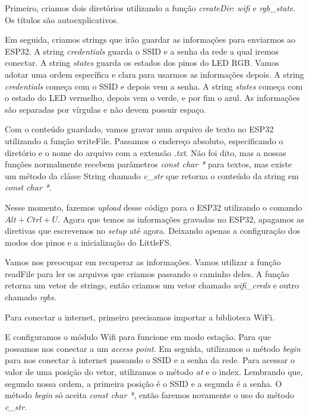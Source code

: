 \documentclass[12pt]{article}
\begin{document}
Primeiro, criamos dois diretórios utilizando a função \textit{createDir}: \textit{wifi} e \textit{rgb\_state}. Os títulos são autoexplicativos.



Em seguida, criamos strings que irão guardar as informações para enviarmos ao ESP32. A string \textit{credentials} guarda o SSID e a senha da rede a qual iremos conectar. A string \textit{states} guarda os estados dos pinos do LED RGB. Vamos adotar uma ordem específica e clara para usarmos as informações depois. A string \textit{credentials} começa com o SSID e depois vem a senha. A string \textit{states} começa com o estado do LED vermelho, depois vem o verde, e por fim o azul. As informações são separadas por vírgulas e não devem possuir espaço.



Com o conteúdo guardado, vamos gravar num arquivo de texto no ESP32 utilizando a função writeFile. Passamos o endereço absoluto, especificando o diretório e o nome do arquivo com a extensão .\textit{txt}. Não foi dito, mas a nossas funções normalmente recebem parâmetros \textit{const char *} para textos, mas existe um método da clásse String chamado \textit{c\_str} que retorna o conteúdo da string em \textit{const char *}.



Nesse momento, fazemos \textit{upload} desse código para o ESP32 utilizando o comando $Alt + Ctrl + U$. Agora que temos as informações gravadas no ESP32, apagamos as diretivas que escrevemos no \textit{setup} até agora. Deixando apenas a configuração dos modos dos pinos e a inicialização do LittleFS. \newpage

Vamos nos preocupar em recuperar as informações. Vamos utilizar a função readFile para ler os arquivos que criamos passando o caminho deles. A função retorna um vetor de strings, então criamos um vetor chamado \textit{wifi\_creds} e outro chamado \textit{rgbs}.



Para conectar a internet, primeiro precisamos importar a biblioteca WiFi. 



E configuramos o módulo Wifi para funcione em modo estação. Para que possamos nos conectar a um \textit{access point}. Em seguida, utilizamos o método \textit{begin} para nos conectar à internet passando o SSID e a senha da rede. Para acessar o valor de uma posição do vetor, utilizamos o método \textit{at} e o index. Lembrando que, segundo nossa ordem, a primeira posição é o SSID e a segunda é a senha. O método \textit{begin} só aceita \textit{const char *}, então faremos novamente o uso do método \textit{c\_str}.
\end{document}
